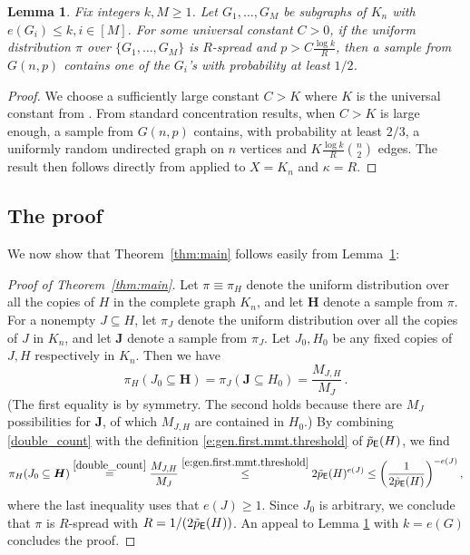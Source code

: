 \documentclass[11pt,reqno]{amsart}
\theoremstyle{plain}
\newtheorem{lemma}[theorem]{Lemma}
\theoremstyle{definition}
\theoremstyle{remark}
\newcommand{\beq}{\begin{equation}}
\newcommand{\eeq}{\end{equation}}
\begin{document}
\begin{lemma}\label{spread_lemma}
Fix integers $k,M \geq 1$. Let $G_1,\ldots,G_{M}$ be subgraphs of $K_n$ with $e(G_i) \leq k, i \in [M]$. For some universal constant $C>0$, if the uniform distribution $\pi$ over $\{G_1,\ldots,G_M\}$ is $R$-spread and  $p>C\frac{ \log k}{R} $, then a sample from $G(n,p)$ contains one of the $G_i$'s with probability at least $1/2$.
\end{lemma}

\begin{proof}We choose a sufficiently large constant $C>K$ where $K$ is the universal constant from \cite[Theorem 1.6]{fracKK_annals}. 
From standard concentration results, when $C>K$ is large enough, a sample from $G(n,p)$ contains, with probability at least $2/3$,
 a uniformly random undirected graph on $n$ vertices and $K\frac{ \log k}{R}\binom{n}{2}$ edges. The result then follows directly from \cite[Theorem 1.6]{fracKK_annals} applied to $X=K_n$ and $\kappa=R$.
\end{proof}

\subsection{The proof}

We now show that Theorem~\ref{thm:main} follows easily from Lemma~\ref{spread_lemma}:

\begin{proof}[Proof of Theorem~\ref{thm:main}]
Let $\pi\equiv\pi_H$ denote the uniform distribution over all the copies of $H$ in the complete graph $K_n$, and let $\bm{H}$ denote a sample from $\pi$. For a {nonempty} $J \subseteq H$, let $\pi_J$ denote the uniform distribution over all the copies of $J$ in $K_n$, and let $\bm{J}$ denote a sample from $\pi_J$. Let $J_0,H_0$ be any fixed copies of $J,H$ respectively in $K_n$. Then we have
	\beq\label{double_count} 
	\pi_H(J_0\subseteq\bm{H})
	=\pi_J( \bm{J} \subseteq H_0 )
	= \frac{M_{J,H}}{M_J}\,.
	\eeq
(The first equality is by symmetry. The second holds because there are $M_J$ possibilities for $\bm{J}$, of which $M_{J,H}$ are contained in $H_0$.) By combining \eqref{double_count}  with the definition \eqref{e:gen.first.mmt.threshold} of $\tilde{p}_\mathsf{E}(H)$, we find
	\[
	\pi_H(J_0\subseteq\bm{H})
	\stackrel{\eqref{double_count}}{=}
		\frac{M_{J,H}}{M_J}
	\stackrel{\eqref{e:gen.first.mmt.threshold}}{\le}
		2 \tilde{p}_\mathsf{E}(H)^{e(J)}
	\le \bigg(
	\frac1{2 \tilde{p}_\mathsf{E}(H)}
	\bigg)^{-e(J)}\,,
	\]
where the last inequality uses that $e(J) \ge1$. Since $J_0$ is arbitrary, we conclude that $\pi$ is $R$-spread with
$R= 1/(2\tilde{p}_\mathsf{E}(H))$. An appeal to Lemma \ref{spread_lemma} with $k=e(G)$ concludes the proof.
\end{proof}
\end{document}
